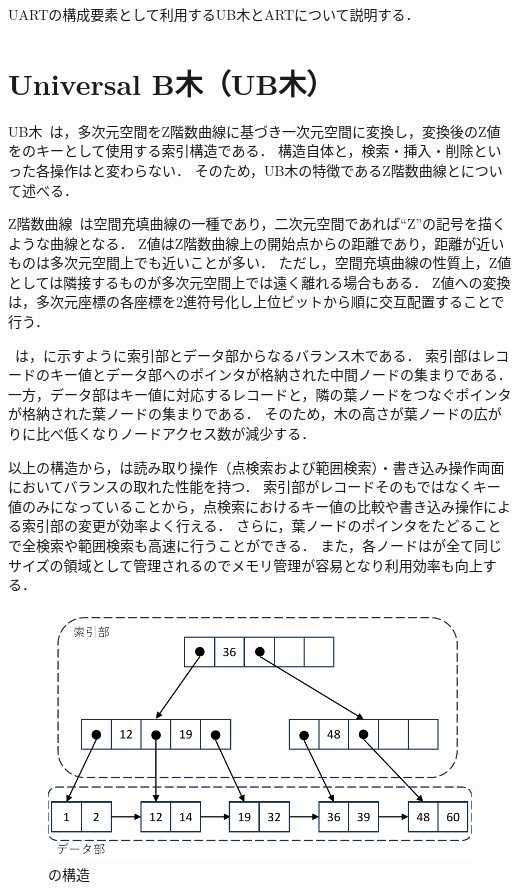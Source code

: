 UARTの構成要素として利用するUB木とARTについて説明する．

\section{Universal B木（UB木）}

UB木~\cite{vldb:ramsak2000}は，多次元空間をZ階数曲線に基づき一次元空間に変換し，変換後のZ値を\BTree{}のキーとして使用する索引構造である．
構造自体と，検索・挿入・削除といった各操作は\BTree{}と変わらない．
そのため，UB木の特徴であるZ階数曲線と\BTree{}について述べる．

Z階数曲線~\cite{acm:Gaede1998}は空間充填曲線の一種であり，二次元空間であれば``Z''の記号を描くような曲線となる．
Z値はZ階数曲線上の開始点からの距離であり，距離が近いものは多次元空間上でも近いことが多い．
ただし，空間充填曲線の性質上，Z値としては隣接するものが多次元空間上では遠く離れる場合もある．
Z値への変換は，多次元座標の各座標を2進符号化し上位ビットから順に交互配置することで行う．

\BTree{}~\cite{book:Kitagawa1996}は，\Fig{\ref{fig:bptree}}に示すように索引部とデータ部からなるバランス木である．
索引部はレコードのキー値とデータ部へのポインタが格納された中間ノードの集まりである．
一方，データ部はキー値に対応するレコードと，隣の葉ノードをつなぐポインタが格納された葉ノードの集まりである．
そのため，木の高さが葉ノードの広がりに比べ低くなりノードアクセス数が減少する．

以上の構造から，\BTree{}は読み取り操作（点検索および範囲検索）・書き込み操作両面においてバランスの取れた性能を持つ．
索引部がレコードそのもではなくキー値のみになっていることから，点検索におけるキー値の比較や書き込み操作による索引部の変更が効率よく行える．
さらに，葉ノードのポインタをたどることで全検索や範囲検索も高速に行うことができる．
また，各ノードはが全て同じサイズの領域として管理されるのでメモリ管理が容易となり利用効率も向上する．

\begin{figure}[t]
  \centering
  \includegraphics{./figures/fig_bptree.pdf}
  \caption{\BTree{}の構造}
  \label{fig:bptree}
\end{figure}

